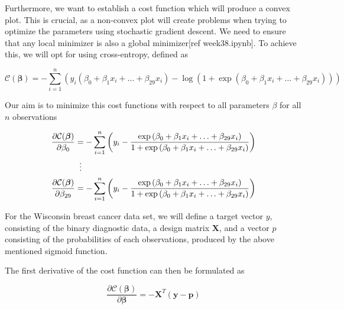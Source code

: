 \documentclass
[twocolumn,
secnumarabic,
nobibnotes,
aps,
prl,
reprint,
groupedaddress,
amsmath,
amssymb
]{revtex4-2}
\begin{document}
Furthermore, we want to establish a cost function which will produce a convex plot. This is crucial, as a non-convex plot  will create problems when trying to optimize the parameters using stochastic gradient descent. We need to ensure that any local minimizer is also a global minimizer[ref week38.ipynb]. To achieve this, we will opt for using cross-entropy, defined as

\begin{widetext}
  \begin{equation}
    \mathcal{C}(\boldsymbol{\beta})=-\sum_{i=1}^n  \left(y_i(\beta_0+\beta_1x_i+ \ldots +\beta_{29}x_i) -\log{(1+\exp{(\beta_0+\beta_1x_i+ \ldots +\beta_{29}x_i)})}\right)
  \end{equation}
\end{widetext}

Our aim is to minimize this cost functions with respect to all parameters \(\beta\) for all $n$ observations

\begin{equation}
  \begin{aligned}
    \nonumber
    \frac{\partial \mathcal{C}(\boldsymbol{\beta})}{\partial \beta_0}    & = -\sum_{i=1}^n  \left(y_i -\frac{\exp{(\beta_0+\beta_1x_i+ \ldots +\beta_{29}x_i)}}{1+\exp{(\beta_0+\beta_1x_i+ \ldots +\beta_{29}x_i)}}\right) \\
                                                                         & \vdotswithin{=}                                                                                                                                  \\
    \frac{\partial \mathcal{C}(\boldsymbol{\beta})}{\partial \beta_{29}} & = -\sum_{i=1}^n  \left(y_i -\frac{\exp{(\beta_0+\beta_1x_i+ \ldots +\beta_{29}x_i)}}{1+\exp{(\beta_0+\beta_1x_i+ \ldots +\beta_{29}x_i)}}\right)
  \end{aligned}
\end{equation}

For the Wisconsin breast cancer data set, we will define a target vector $y$, consisting of the binary diagnostic data, a design matrix $\bm{X}$, and a vector $p$ consisting of the probabilities of each observations, produced by the above mentioned sigmoid function.

The first derivative of the cost function can then be formulated as

\begin{equation}
  \nonumber
  \frac{\partial \mathcal{C}(\boldsymbol{\beta})}{\partial \boldsymbol{\beta}} = -\boldsymbol{X}^T\left(\boldsymbol{y}-\boldsymbol{p}\right)
\end{equation}
\end{document}
